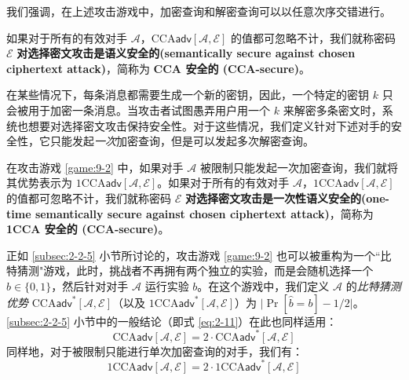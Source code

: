 我们强调，在上述攻击游戏中，加密查询和解密查询可以以任意次序交错进行。

\begin{definition}\label{def:9-5}
如果对于所有的有效对手 $\mathcal{A}$，$\mathrm{CCA}\mathsf{adv}[\mathcal{A},\mathcal{E}]$ 的值都可忽略不计，我们就称密码 $\mathcal{E}$ \textbf{对选择密文攻击是语义安全的(semantically secure against chosen ciphertext attack)}，简称为 \textbf{CCA 安全的 (CCA-secure)}。
\end{definition}

在某些情况下，每条消息都需要生成一个新的密钥，因此，一个特定的密钥 $k$ 只会被用于加密一条消息。当攻击者试图愚弄用户用一个 $k$ 来解密多条密文时，系统也想要对选择密文攻击保持安全性。对于这些情况，我们定义针对下述对手的安全性，它只能发起\emph{一次}加密查询，但是可以发起多次解密查询。

\begin{definition}\label{def:9-6}
在攻击游戏 \ref{game:9-2} 中，如果对手 $\mathcal{A}$ 被限制只能发起一次加密查询，我们就将其优势表示为 $\mathrm{1CCA}\mathsf{adv}[\mathcal{A},\mathcal{E}]$。如果对于所有的有效对手 $\mathcal{A}$，$\mathrm{1CCA}\mathsf{adv}[\mathcal{A},\mathcal{E}]$ 的值都可忽略不计，我们就称密码 $\mathcal{E}$ \textbf{对选择密文攻击是一次性语义安全的(one-time semantically secure against chosen ciphertext attack)}，简称为 \textbf{1CCA 安全的 (CCA-secure)}。
\end{definition}

正如 \ref{subsec:2-2-5} 小节所讨论的，攻击游戏 \ref{game:9-2} 也可以被重构为一个``比特猜测"游戏，此时，挑战者不再拥有两个独立的实验，而是会随机选择一个 $b\in\{0,1\}$，然后针对对手 $\mathcal{A}$ 运行实验 $b$。在这个游戏中，我们定义 $\mathcal{A}$ 的\emph{比特猜测优势} $\mathrm{CCA}\mathsf{adv}^*[\mathcal{A},\mathcal{E}]$（以及 $\mathrm{1CCA}\mathsf{adv}^*[\mathcal{A},\mathcal{E}]$）为 $\lvert\Pr[\hat{b}=b]-1/2\lvert$。\ref{subsec:2-2-5} 小节中的一般结论（即式 \ref{eq:2-11}）在此也同样适用：
\begin{equation}\label{eq:9-1}
\mathrm{CCA}\mathsf{adv}[\mathcal{A},\mathcal{E}]
=
2\cdot
\mathrm{CCA}\mathsf{adv}^*[\mathcal{A},\mathcal{E}]
\end{equation}
同样地，对于被限制只能进行单次加密查询的对手，我们有：
\begin{equation}\label{eq:9-2}
\mathrm{1CCA}\mathsf{adv}[\mathcal{A},\mathcal{E}]
=
2\cdot
\mathrm{1CCA}\mathsf{adv}^*[\mathcal{A},\mathcal{E}]
\end{equation}


